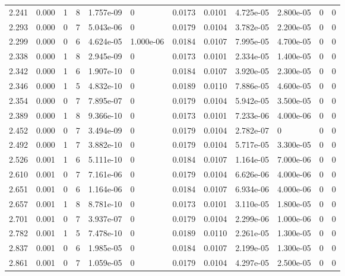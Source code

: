 \documentclass[preview]{standalone}
\begin{document}
{{{\begin{tabular}{L{1.2cm}C{1.2cm} C{0.3cm}C{0.5cm} C{1.4cm}C{1.4cm} C{1.4cm}C{1.4cm} C{1.6cm}C{1.6cm} C{1.6cm}C{1.6cm}}
  2.241  &  0.000  & 1     &  8 &  1.757e-09  & 0  &  0.0173&   0.0101& 4.725e-05 & 2.800e-05   &  0 & 0  \\ 
  2.293  &  0.000  & 0     &  7 &  5.043e-06  & 0  &  0.0179&   0.0104& 3.782e-05 & 2.200e-05   &  0 & 0  \\ 
  2.299  &  0.000  & 0     &  6 &  4.624e-05  & 1.000e-06  &  0.0184&   0.0107& 7.995e-05 & 4.700e-05   &  0 & 0  \\ 
  2.338  &  0.000  & 1     &  8 &  2.945e-09  & 0  &  0.0173&   0.0101& 2.334e-05 & 1.400e-05   &  0 & 0  \\ 
  2.342  &  0.000  & 1     &  6 &  1.907e-10  & 0  &  0.0184&   0.0107& 3.920e-05 & 2.300e-05   &  0 & 0  \\ 
  2.346  &  0.000  & 1     &  5 &  4.832e-10  & 0  &  0.0189&   0.0110& 7.886e-05 & 4.600e-05   &  0 & 0  \\ 
  2.354  &  0.000  & 0     &  7 &  7.895e-07  & 0  &  0.0179&   0.0104& 5.942e-05 & 3.500e-05   &  0 & 0  \\ 
  2.389  &  0.000  & 1     &  8 &  9.366e-10  & 0  &  0.0173&   0.0101& 7.233e-06 & 4.000e-06   &  0 & 0  \\ 
  2.452  &  0.000  & 0     &  7 &  3.494e-09  & 0  &  0.0179&   0.0104& 2.782e-07 & 0   &  0 & 0  \\ 
  2.492  &  0.000  & 1     &  7 &  3.882e-10  & 0  &  0.0179&   0.0104& 5.717e-05 & 3.300e-05   &  0 & 0  \\ 
  2.526  &  0.001  & 1     &  6 &  5.111e-10  & 0  &  0.0184&   0.0107& 1.164e-05 & 7.000e-06   &  0 & 0  \\ 
  2.610  &  0.001  & 0     &  7 &  7.161e-06  & 0  &  0.0179&   0.0104& 6.626e-06 & 4.000e-06   &  0 & 0  \\ 
  2.651  &  0.001  & 0     &  6 &  1.164e-06  & 0  &  0.0184&   0.0107& 6.934e-06 & 4.000e-06   &  0 & 0  \\ 
  2.657  &  0.001  & 1     &  8 &  8.781e-10  & 0  &  0.0173&   0.0101& 3.110e-05 & 1.800e-05   &  0 & 0  \\ 
  2.701  &  0.001  & 0     &  7 &  3.937e-07  & 0  &  0.0179&   0.0104& 2.299e-06 & 1.000e-06   &  0 & 0  \\ 
  2.782  &  0.001  & 1     &  5 &  7.478e-10  & 0  &  0.0189&   0.0110& 2.261e-05 & 1.300e-05   &  0 & 0  \\ 
  2.837  &  0.001  & 0     &  6 &  1.985e-05  & 0  &  0.0184&   0.0107& 2.199e-05 & 1.300e-05   &  0 & 0  \\ 
  2.861  &  0.001  & 0     &  7 &  1.059e-05  & 0  &  0.0179&   0.0104& 4.297e-05 & 2.500e-05   &  0 & 0  \\ 

\end{tabular}}}}
\end{document}
